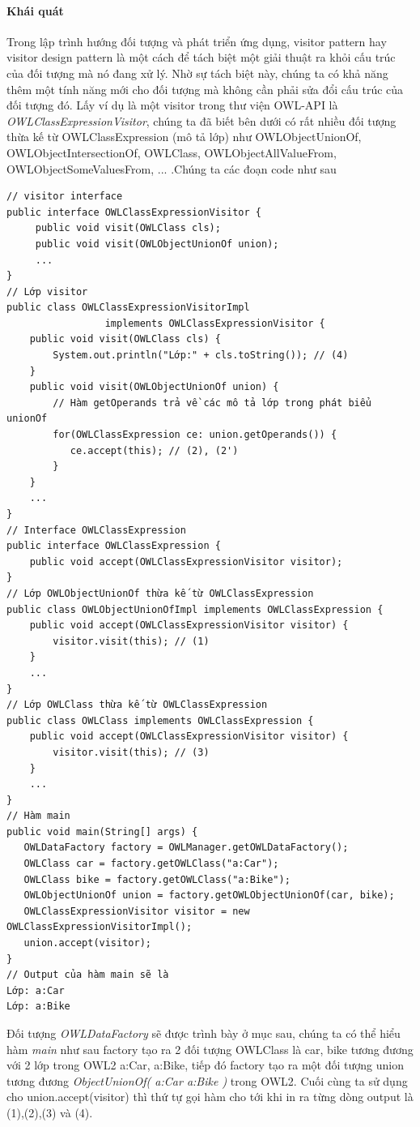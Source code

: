 \paragraph{Khái quát} Trong lập trình hướng đối tượng và phát triển ứng dụng, visitor pattern hay visitor design pattern là một cách để tách biệt một giải thuật ra khỏi cấu trúc của đối tượng mà nó đang xử lý. Nhờ sự tách biệt này, chúng ta có khả năng thêm một tính năng mới cho đối tượng mà không cần phải sửa đổi cấu trúc của đối tượng đó. Lấy ví dụ là một visitor trong thư viện OWL-API là \textit{OWLClassExpressionVisitor}, chúng ta đã biết bên dưới có rất nhiều đối tượng thừa kế từ OWLClassExpression (mô tả lớp) như OWLObjectUnionOf, OWLObjectIntersectionOf, OWLClass, OWLObjectAllValueFrom, OWLObjectSomeValuesFrom, ... .Chúng ta các đoạn code như sau
\begin{verbatim}
// visitor interface
public interface OWLClassExpressionVisitor {
     public void visit(OWLClass cls);
     public void visit(OWLObjectUnionOf union);
     ...
}
// Lớp visitor
public class OWLClassExpressionVisitorImpl 
                 implements OWLClassExpressionVisitor {
    public void visit(OWLClass cls) {
        System.out.println("Lớp:" + cls.toString()); // (4)
    }
    public void visit(OWLObjectUnionOf union) {
        // Hàm getOperands trả về các mô tả lớp trong phát biểu unionOf
        for(OWLClassExpression ce: union.getOperands()) {
           ce.accept(this); // (2), (2')
        }
	}
	...
}
// Interface OWLClassExpression
public interface OWLClassExpression {
    public void accept(OWLClassExpressionVisitor visitor);
}
// Lớp OWLObjectUnionOf thừa kế từ OWLClassExpression
public class OWLObjectUnionOfImpl implements OWLClassExpression {
	public void accept(OWLClassExpressionVisitor visitor) {
    	visitor.visit(this); // (1)
    }
    ...
}
// Lớp OWLClass thừa kế từ OWLClassExpression 
public class OWLClass implements OWLClassExpression {
    public void accept(OWLClassExpressionVisitor visitor) {
        visitor.visit(this); // (3)
    }
    ...
}
// Hàm main 
public void main(String[] args) {
   OWLDataFactory factory = OWLManager.getOWLDataFactory();
   OWLClass car = factory.getOWLClass("a:Car");
   OWLClass bike = factory.getOWLClass("a:Bike");
   OWLObjectUnionOf union = factory.getOWLObjectUnionOf(car, bike);
   OWLClassExpressionVisitor visitor = new OWLClassExpressionVisitorImpl();
   union.accept(visitor);                                       
}
// Output của hàm main sẽ là 
Lớp: a:Car
Lớp: a:Bike
\end{verbatim}
Đối tượng \textit{OWLDataFactory} sẽ được trình bày ở mục sau, chúng ta có thể hiểu hàm \textit{main} như sau factory tạo ra 2 đối tượng OWLClass là car, bike tương đương với 2 lớp trong OWL2 a:Car, a:Bike, tiếp đó factory tạo ra một đối tượng union tương đương \textit{ObjectUnionOf( a:Car a:Bike )} trong OWL2. Cuối cùng ta sử dụng cho union.accept(visitor) thì thứ tự gọi hàm cho tới khi in ra từng dòng output là (1),(2),(3) và (4). 

